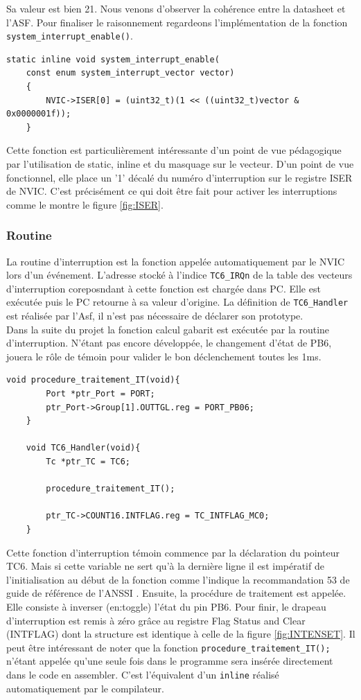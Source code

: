 \documentclass[a4paper]{article}
\begin{document}
	Sa valeur est bien 21. Nous venons d'observer la cohérence entre la datasheet et l'ASF. Pour finaliser le raisonnement regardeons l'implémentation de la fonction \texttt{system\_interrupt\_enable()}.
	\begin{lstlisting}[style=CStyle]
	static inline void system_interrupt_enable(
	const enum system_interrupt_vector vector)
	{
		NVIC->ISER[0] = (uint32_t)(1 << ((uint32_t)vector & 0x0000001f));
	}\end{lstlisting}
	Cette fonction est particulièrement intéressante d'un point de vue pédagogique par l'utilisation de static, inline et du masquage sur le vecteur. D'un point de vue fonctionnel, elle place un '1' décalé du numéro d'interruption sur le registre ISER de NVIC. C'est précisément ce qui doit être fait pour activer les interruptions comme le montre le figure \ref{fig:ISER}.
	
	\subsubsection{Routine}
	La routine d'interruption est la fonction appelée automatiquement par le NVIC lors d'un événement. L'adresse stocké à l'indice \texttt{TC6\_IRQn} de la table des vecteurs d'interruption coreposndant à cette fonction est chargée dans PC. Elle est exécutée puis le PC retourne à sa valeur d'origine. La définition de \texttt{TC6\_Handler} est réalisée par l'Asf, il n'est pas nécessaire de déclarer son prototype. \\
	Dans la suite du projet la fonction calcul gabarit est exécutée par la routine d'interruption. N'étant pas encore développée, le changement d'état de PB6, jouera le rôle de témoin pour valider le bon déclenchement toutes les 1ms.
	\begin{lstlisting}[style=CStyle]
	void procedure_traitement_IT(void){
		Port *ptr_Port = PORT;
		ptr_Port->Group[1].OUTTGL.reg = PORT_PB06;
	}
	
	void TC6_Handler(void){
		Tc *ptr_TC = TC6;
				
		procedure_traitement_IT();
		
		ptr_TC->COUNT16.INTFLAG.reg = TC_INTFLAG_MC0;
	}
	\end{lstlisting}
	Cette fonction d'interruption témoin commence par la déclaration du pointeur TC6. Mais si cette variable ne sert qu'à la dernière ligne il est impératif de l'initialisation au début de la fonction comme l'indique la recommandation 53 de guide de référence de l'ANSSI \cite{ANSSI2021}. Ensuite, la procédure de traitement est appelée. Elle consiste à inverser (en:toggle) l'état du pin PB6. Pour finir, le drapeau d'interruption est remis à zéro grâce au registre Flag Status and Clear
	(INTFLAG) dont la structure est identique à celle de la figure \ref{fig:INTENSET}. Il peut être intéressant de noter que la fonction \texttt{procedure\_traitement\_IT();} n'étant appelée qu'une seule fois dans le programme sera insérée directement dans le code en assembler. C'est l'équivalent d'un \texttt{inline} réalisé automatiquement par le compilateur.
	\newline
	\indent
	
\end{document}
